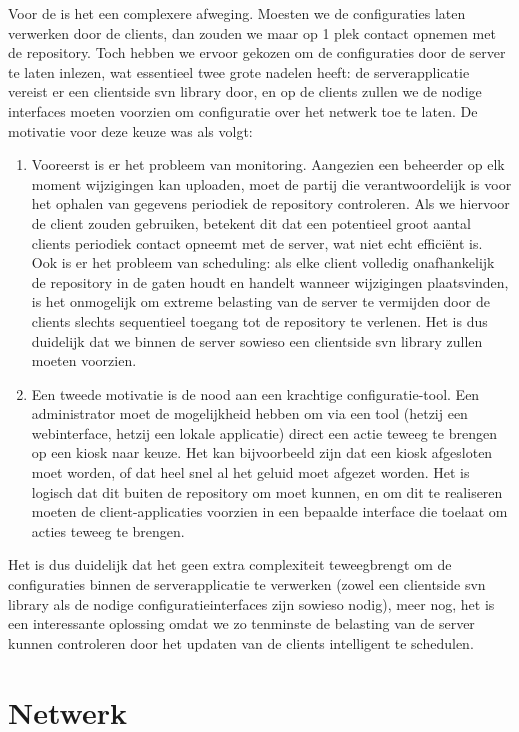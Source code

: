 Voor de  is het een complexere afweging. Moesten we de configuraties laten verwerken door de clients, dan zouden we maar op 1 plek contact opnemen met de repository. Toch hebben we ervoor gekozen om de configuraties door de server te laten inlezen, wat essentieel twee grote nadelen heeft: de serverapplicatie vereist er een clientside \ac{svn} library door, en op de clients zullen we de nodige interfaces moeten voorzien om configuratie over het netwerk toe te laten. De motivatie voor deze keuze was als volgt:

\begin{enumerate}
\item Vooreerst is er het probleem van monitoring. Aangezien een beheerder op elk moment wijzigingen kan uploaden, moet de partij die verantwoordelijk is voor het ophalen van gegevens periodiek de repository controleren. Als we hiervoor de client zouden gebruiken, betekent dit dat een potentieel groot aantal clients periodiek contact opneemt met de server, wat niet echt efficiënt is. Ook is er het probleem van scheduling: als elke client volledig onafhankelijk de repository in de gaten houdt en handelt wanneer wijzigingen plaatsvinden, is het onmogelijk om extreme belasting van de server te vermijden door de clients slechts sequentieel toegang tot de repository te verlenen. Het is dus duidelijk dat we binnen de server sowieso een clientside \ac{svn} library zullen moeten voorzien.
\item Een tweede motivatie is de nood aan een krachtige configuratie-tool. Een administrator moet de mogelijkheid hebben om via een tool (hetzij een webinterface, hetzij een lokale applicatie) direct een actie teweeg te brengen op een kiosk naar keuze. Het kan bijvoorbeeld zijn dat een kiosk afgesloten moet worden, of dat heel snel al het geluid moet afgezet worden. Het is logisch dat dit buiten de repository om moet kunnen, en om dit te realiseren moeten de client-applicaties voorzien in een bepaalde interface die toelaat om acties teweeg te brengen.
\end{enumerate}

Het is dus duidelijk dat het geen extra complexiteit teweegbrengt om de configuraties binnen de serverapplicatie te verwerken (zowel een clientside \ac{svn} library als de nodige configuratieinterfaces zijn sowieso nodig), meer nog, het is een interessante oplossing omdat we zo tenminste de belasting van de server kunnen controleren door het updaten van de clients intelligent te schedulen.

\section{Netwerk}
\label{ontwerp:applicatie:netwerk}

